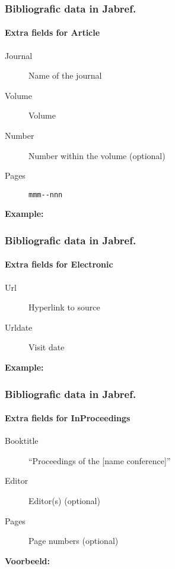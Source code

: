 \documentclass[aspectratio=169]{beamer}
\begin{document}
\begin{frame}[fragile]
  \frametitle{Bibliografic data in Jabref.}
  \framesubtitle{Extra fields for Article}

  \begin{description}
    \item[Journal] Name of the journal
    \item[Volume] Volume
    \item[Number] Number within the volume (optional)
    \item[Pages] \verb|mmm--nnn|
  \end{description}

  \bigskip

  \textbf{Example:}

  \bigskip

\end{frame}

\begin{frame}[plain]
  \frametitle{Bibliografic data in Jabref.}
  \framesubtitle{Extra fields for Electronic}

  \begin{description}
    \item[Url] Hyperlink to source
    \item[Urldate] Visit date
  \end{description}

  \bigskip

  \textbf{Example:}

  \bigskip


\end{frame}

\begin{frame}[plain]
  \frametitle{Bibliografic data in Jabref.}
  \framesubtitle{Extra fields for InProceedings}

  \begin{description}
    \item[Booktitle] ``Proceedings of the [name conference]''
    \item[Editor] Editor(s) (optional)
    \item[Pages] Page numbers (optional)
  \end{description}

  \medskip

  \textbf{Voorbeeld:}

\end{frame}
\end{document}
